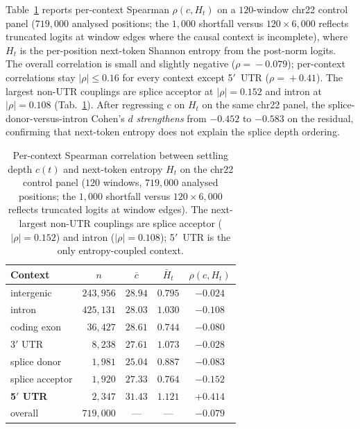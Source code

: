 \documentclass{article}
\theoremstyle{plain}
\theoremstyle{definition}
\theoremstyle{remark}
\begin{document}
Table~\ref{tab:entropy-decoup} reports per-context Spearman $\rho(c,
H_t)$ on a $120$-window chr22 control panel ($719{,}000$ analysed positions; the
  $1{,}000$ shortfall versus $120\!\times\!6{,}000$ reflects truncated logits at
window edges where the causal context is incomplete), where
$H_t$ is the per-position next-token Shannon entropy from the post-norm
logits. The overall correlation is small and slightly negative
($\rho\!=\!-0.079$); per-context correlations stay $|\rho|\!\leq\!0.16$
for every context except 5$'$~UTR ($\rho\!=\!+0.41$). The largest
non-UTR couplings are splice acceptor at $|\rho|\!=\!0.152$ and intron
at $|\rho|\!=\!0.108$ (Tab.~\ref{tab:entropy-decoup}). After regressing
$c$ on $H_t$ on the same chr22 panel, the splice-donor-versus-intron
Cohen's $d$ \emph{strengthens} from $-0.452$ to $-0.583$ on the
residual, confirming that next-token entropy does not explain the
splice depth ordering.

\begin{table}[!htbp]
  \caption{Per-context Spearman correlation between settling depth $c(t)$
    and next-token entropy $H_t$ on the chr22 control panel
    ($120$ windows, $719{,}000$ analysed positions; the $1{,}000$ shortfall versus
    $120\!\times\!6{,}000$ reflects truncated logits at window edges). The next-largest
    non-UTR couplings are splice acceptor ($|\rho|\!=\!0.152$) and intron
  ($|\rho|\!=\!0.108$); 5$'$~UTR is the only entropy-coupled context.}
  \label{tab:entropy-decoup}
  \centering
  \small
  \begin{tabular}{@{}lcccc@{}}
    \toprule
    Context & $n$ & $\overline{c}$ & $\bar H_t$ & $\rho(c, H_t)$ \\
    \midrule
    intergenic        & $243{,}956$ & $28.94$ & $0.795$ & $-0.024$ \\
    intron            & $425{,}131$ & $28.03$ & $1.030$ & $-0.108$ \\
    coding exon       & $\phantom{0}36{,}427$ & $28.61$ & $0.744$ & $-0.080$ \\
    3$'$ UTR          & $\phantom{00}8{,}238$ & $27.61$ & $1.073$ & $-0.028$ \\
    splice donor      & $\phantom{00}1{,}981$ & $25.04$ & $0.887$ & $-0.083$ \\
    splice acceptor   & $\phantom{00}1{,}920$ & $27.33$ & $0.764$ & $-0.152$ \\
    \textbf{5$'$ UTR} & $\phantom{00}2{,}347$ & $31.43$ & $1.121$ & $\mathbf{+0.414}$ \\
    \midrule
    overall           & $719{,}000$ & --- & --- & $-0.079$ \\
    \bottomrule
  \end{tabular}
\end{table}
\end{document}
